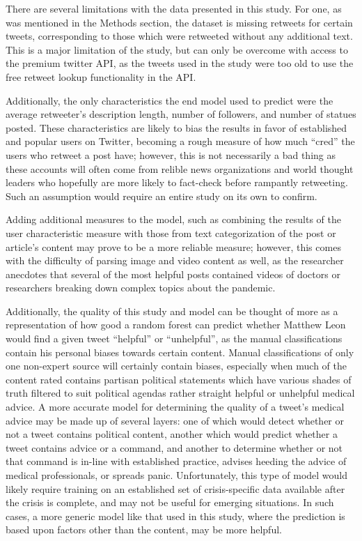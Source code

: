 \documentclass[conference]{IEEEtran}
\begin{document}
There are several limitations with the data presented in this
study. For one, as was mentioned in the Methods section, the
dataset is missing retweets for certain tweets, corresponding to
those which were retweeted without any additional text. This is a
major limitation of the study, but can only be overcome with
access to the premium twitter API, as the tweets used in the
study were too old to use the free retweet lookup functionality
in the API.

Additionally, the only characteristics the end model used to
predict were the average retweeter's description length, number
of followers, and number of statues posted. These characteristics
are likely to bias the results in favor of established and
popular users on Twitter, becoming a rough measure of how much
``cred'' the users who retweet a post have; however, this is not
necessarily a bad thing as these accounts will often come from
relible news organizations and world thought leaders who
hopefully are more likely to fact-check before rampantly
retweeting. Such an assumption would require an entire study on
its own to confirm.

Adding additional measures to the model, such as combining the
results of the user characteristic measure with those from text
categorization of the post or article's content may prove to be
a more reliable measure; however, this comes with the difficulty
of parsing image and video content as well, as the researcher
anecdotes that several of the most helpful posts contained videos
of doctors or researchers breaking down complex topics about the
pandemic.

Additionally, the quality of this study and model can be thought
of more as a representation of how good a random forest can
predict whether Matthew Leon would find a given tweet ``helpful''
or ``unhelpful'', as the manual classifications contain his
personal biases towards certain content. Manual classifications
of only one non-expert source will certainly contain biases,
especially when much of the content rated contains partisan
political statements which have various shades of truth filtered
to suit political agendas rather straight helpful or unhelpful
medical advice. A more accurate model for determining the quality
of a tweet's medical advice may be made up of several layers: one
of which would detect whether or not a tweet contains political
content, another which would predict whether a tweet contains
advice or a command, and another to determine whether or not that
command is in-line with established practice, advises heeding the
advice of medical professionals, or spreads panic.
Unfortunately, this type of model would likely require training
on an established set of crisis-specific data available after the
crisis is complete, and may not be useful for emerging
situations. In such cases, a more generic model like that used in
this study, where the prediction is based upon factors other than
the content, may be more helpful.
\end{document}

